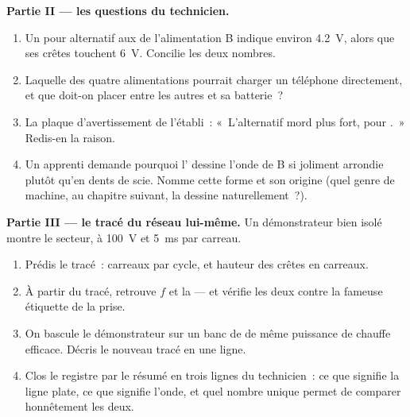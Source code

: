 \begin{problem}
\medskip\noindent\textbf{Partie II --- les questions du
technicien.}
\begin{enumerate}[resume]
  \item Un  pour alternatif aux  de l'alimentation B
        indique environ \qty{4.2}{V}, alors que ses crêtes touchent
        \qty{6}{V}. Concilie les deux nombres.
  \item Laquelle des quatre alimentations pourrait charger un
        téléphone directement, et que doit-on placer entre les
        autres et sa batterie~?
  \item La plaque d'avertissement de l'établi~: «~L'alternatif mord
        plus fort,  pour .~» Redis-en la raison.
  \item Un apprenti demande pourquoi l' dessine l'onde
        de B si joliment arrondie plutôt qu'en dents de scie. Nomme
        cette forme et son origine (quel genre de machine, au
        chapitre suivant, la dessine naturellement~?).
\end{enumerate}

\medskip\noindent\textbf{Partie III --- le tracé du réseau
lui-même.}
Un démonstrateur bien isolé montre le secteur, à \qty{100}{V} et
\qty{5}{ms} par carreau.
\begin{enumerate}[resume]
  \item Prédis le tracé~: carreaux par cycle, et hauteur des crêtes
        en carreaux.
  \item À partir du tracé, retrouve $f$ et la  ---
        et vérifie les deux contre la fameuse étiquette de la
        prise.
  \item On bascule le démonstrateur sur un banc de  de même
        puissance de chauffe efficace. Décris le nouveau tracé en
        une ligne.
  \item Clos le registre par le résumé en trois lignes du
        technicien~: ce que signifie la ligne plate, ce que
        signifie l'onde, et quel nombre unique permet de comparer
        honnêtement les deux.
\end{enumerate}
\end{problem}
